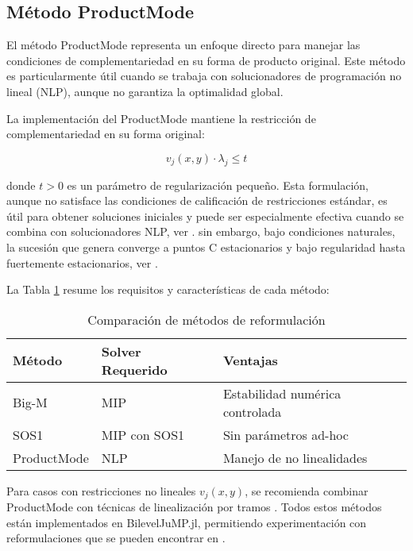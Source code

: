 \subsection{Método ProductMode}

El método ProductMode representa un enfoque directo para manejar las condiciones de complementariedad en su forma de producto original. Este método es particularmente útil cuando se trabaja con solucionadores de programación no lineal (NLP), aunque no garantiza la optimalidad global.

La implementación del ProductMode mantiene la restricción de complementariedad en su forma original:

\begin{equation}
    v_j(x,y) \cdot \lambda_j \leq t \label{eq:ProductMode_reg}
\end{equation}

donde $t > 0$ es un parámetro de regularización pequeño. Esta formulación, aunque no satisface las condiciones de calificación de restricciones estándar, es útil para obtener soluciones iniciales y puede ser especialmente efectiva cuando se combina con solucionadores NLP, ver \cite{BilevelJump}. sin embargo, bajo condiciones naturales, la sucesión que genera converge a puntos C  estacionarios y bajo regularidad hasta fuertemente estacionarios, ver \cite{scholtes12}.  



La Tabla \ref{tab:comparacion_metodos} resume los requisitos y características de cada método:

\begin{table}[H]
\centering
\begin{tabular}{l|l|l}
\textbf{Método} & \textbf{Solver Requerido} & \textbf{Ventajas} \\ \hline
Big-M & MIP & Estabilidad numérica controlada \\
SOS1 & MIP con SOS1 & Sin parámetros ad-hoc \\
ProductMode & NLP & Manejo de no linealidades \\
\end{tabular}
\caption{Comparación de métodos de reformulación}
\label{tab:comparacion_metodos}
\end{table}

Para casos con restricciones no lineales $v_j(x,y)$, se recomienda combinar ProductMode con técnicas de linealización por tramos \cite[Apéndice B]{BilevelJump}. Todos estos métodos están implementados en BilevelJuMP.jl, permitiendo experimentación con reformulaciones que se pueden encontrar en \cite[Sección 4]{BilevelJump}.


